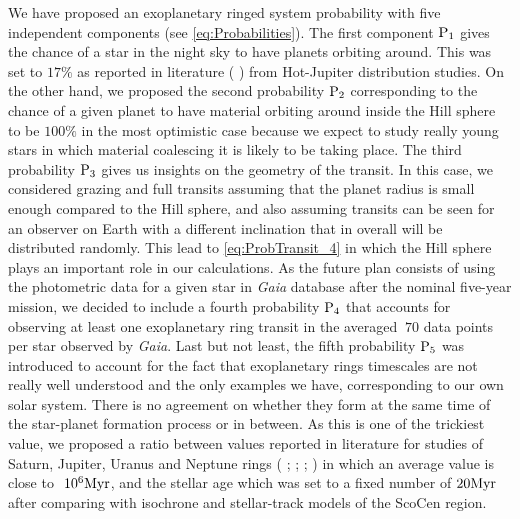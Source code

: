 We have proposed an exoplanetary ringed system probability with five independent components (see \autoref{eq:Probabilities}). The first component $\textnormal{P}_1$ gives the chance of a star in the night sky to have planets orbiting around. This was set to $17\%$ as reported in literature ( \citeyear{2012Natur.481..167C}) from Hot-Jupiter distribution studies. On the other hand, we proposed the second probability $\textnormal{P}_2$ corresponding to the chance of a given planet to have material orbiting around inside the Hill sphere to be $100\%$ in the most optimistic case because we expect to study really young stars in which material coalescing it is likely to be taking place. The third probability $\textnormal{P}_3$ gives us insights on the geometry of the transit. In this case, we considered grazing and full transits assuming that the planet radius is small enough compared to the Hill sphere, and also assuming transits can be seen for an observer on Earth with a different inclination that in overall will be distributed randomly. This lead to \autoref{eq:ProbTransit_4} in which the Hill sphere plays an important role in our calculations. As the future plan consists of using the photometric data for a given star in \textit{Gaia} database after the nominal five-year mission, we decided to include a fourth probability $\textnormal{P}_4$ that accounts for observing at least one exoplanetary ring transit in the averaged $~70$ data points per star observed by \textit{Gaia}. Last but not least, the fifth probability $\textnormal{P}_5$ was introduced to account for the fact that exoplanetary rings timescales are not really well understood and the only examples we have, corresponding to our own solar system. There is no agreement on whether they form at the same time of the star-planet formation process or in between. As this is one of the trickiest value, we proposed a ratio between values reported in literature for studies of Saturn, Jupiter, Uranus and Neptune rings ( \citeyear{1984prin.conf..641H};  \citeyear{1994P&SS...42.1139C};  \citeyear{2009sfch.book..537C};  \citeyear{2013pss3.book..309T}) in which an average value is close to $~10^6\textnormal{Myr}$, and the stellar age which was set to a fixed number of $20\textnormal{Myr}$ after comparing with isochrone and stellar-track models of the ScoCen region.\\


